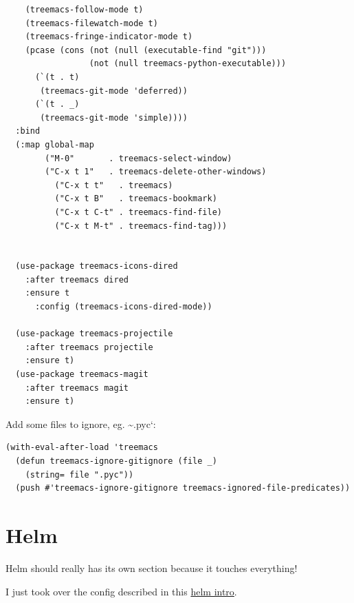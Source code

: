 \documentclass[11pt]{article}
\begin{document}
\begin{verbatim}
    (treemacs-follow-mode t)
    (treemacs-filewatch-mode t)
    (treemacs-fringe-indicator-mode t)
    (pcase (cons (not (null (executable-find "git")))
                 (not (null treemacs-python-executable)))
      (`(t . t)
       (treemacs-git-mode 'deferred))
      (`(t . _)
       (treemacs-git-mode 'simple))))
  :bind
  (:map global-map
        ("M-0"       . treemacs-select-window)
        ("C-x t 1"   . treemacs-delete-other-windows)
          ("C-x t t"   . treemacs)
          ("C-x t B"   . treemacs-bookmark)
          ("C-x t C-t" . treemacs-find-file)
          ("C-x t M-t" . treemacs-find-tag)))


  (use-package treemacs-icons-dired
    :after treemacs dired
    :ensure t
      :config (treemacs-icons-dired-mode))

  (use-package treemacs-projectile
    :after treemacs projectile
    :ensure t)
  (use-package treemacs-magit
    :after treemacs magit
    :ensure t)
\end{verbatim}

Add some files to ignore, eg. \textasciitilde{}.pyc`:

\begin{verbatim}
(with-eval-after-load 'treemacs
  (defun treemacs-ignore-gitignore (file _)
    (string= file ".pyc"))
  (push #'treemacs-ignore-gitignore treemacs-ignored-file-predicates))
\end{verbatim}

\section{Helm}
\label{sec:org9c0fca6}

Helm should really has its own section because it touches everything!

I just took over the config described in this \href{https://tuhdo.github.io/helm-intro.html}{helm intro}.
\end{document}
